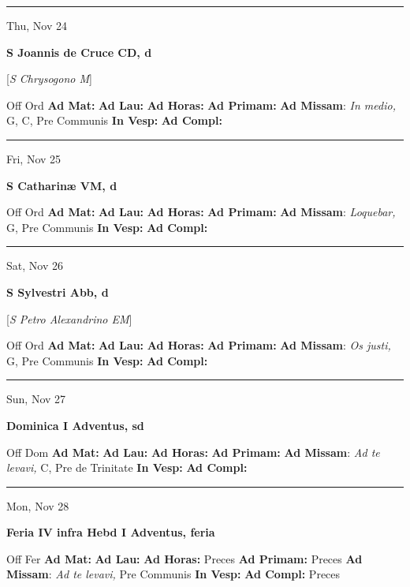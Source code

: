 \documentclass[letterpaper, 10pt]{article}
\begin{document}
\hrule
\begin{center}
Thu, Nov 24
\end{center}\textbf{ \large S Joannis de Cruce CD, \textnormal{\normalsize d}}

[\textit{S Chrysogono M}]
\begin{justify}
Off Ord
\textbf{Ad Mat: }
\textbf{Ad Lau: }
\textbf{Ad Horas: }
\textbf{Ad Primam: }
\textbf{Ad Missam}: \textit{In medio,} G, C, Pre Communis
\textbf{In Vesp: }
\textbf{Ad Compl: }\end{justify}



\hrule
\begin{center}
Fri, Nov 25
\end{center}\textbf{ \large S Catharinæ VM, \textnormal{\normalsize d}}
\begin{justify}
Off Ord
\textbf{Ad Mat: }
\textbf{Ad Lau: }
\textbf{Ad Horas: }
\textbf{Ad Primam: }
\textbf{Ad Missam}: \textit{Loquebar,} G, Pre Communis
\textbf{In Vesp: }
\textbf{Ad Compl: }\end{justify}



\hrule
\begin{center}
Sat, Nov 26
\end{center}\textbf{ \large S Sylvestri Abb, \textnormal{\normalsize d}}

[\textit{S Petro Alexandrino EM}]
\begin{justify}
Off Ord
\textbf{Ad Mat: }
\textbf{Ad Lau: }
\textbf{Ad Horas: }
\textbf{Ad Primam: }
\textbf{Ad Missam}: \textit{Os justi,} G, Pre Communis
\textbf{In Vesp: }
\textbf{Ad Compl: }\end{justify}



\hrule
\begin{center}
Sun, Nov 27
\end{center}\textbf{ \large Dominica I Adventus, \textnormal{\normalsize sd}}
\begin{justify}
Off Dom
\textbf{Ad Mat: }
\textbf{Ad Lau: }
\textbf{Ad Horas: }
\textbf{Ad Primam: }
\textbf{Ad Missam}: \textit{Ad te levavi,} C, Pre de Trinitate
\textbf{In Vesp: }
\textbf{Ad Compl: }\end{justify}



\hrule
\begin{center}
Mon, Nov 28
\end{center}\textbf{ \large Feria IV infra Hebd I Adventus, \textnormal{\normalsize feria}}
\begin{justify}
Off Fer
\textbf{Ad Mat: }
\textbf{Ad Lau: }
\textbf{Ad Horas: }Preces
\textbf{Ad Primam: }Preces
\textbf{Ad Missam}: \textit{Ad te levavi,} Pre Communis
\textbf{In Vesp: }
\textbf{Ad Compl: }Preces\end{justify}
\end{document}
